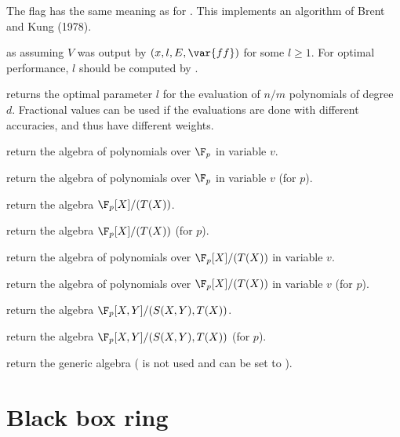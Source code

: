 The flag  has the same meaning as for . This
implements an algorithm of Brent and Kung (1978).

as  assuming $V$ was output by
$(x, l, E, \var{ff})$ for some $l\geq 1$. For optimal
performance, $l$ should be computed by .

 returns the optimal
parameter $l$ for the evaluation of $n/m$ polynomials of degree $d$.
Fractional values can be used if the evaluations are done with different
accuracies, and thus have different weights.


return the algebra of polynomials over $\F_p$ in variable $v$.

return the algebra of polynomials over $\F_p$ in variable $v$ (for  $p$).

return the algebra $\F_p[X]/(T(X))$.

return the algebra $\F_p[X]/(T(X))$ (for  $p$).

return the algebra of polynomials over $\F_p[X]/(T(X))$ in variable $v$.

return the algebra of polynomials over $\F_p[X]/(T(X))$ in variable $v$ (for
 $p$).

return the algebra $\F_p[X,Y]/(S(X,Y),T(X))$.

return the algebra $\F_p[X,Y]/(S(X,Y),T(X))$ (for  $p$).

return the generic algebra ( is not used and can be set to ).

\section{Black box ring}


